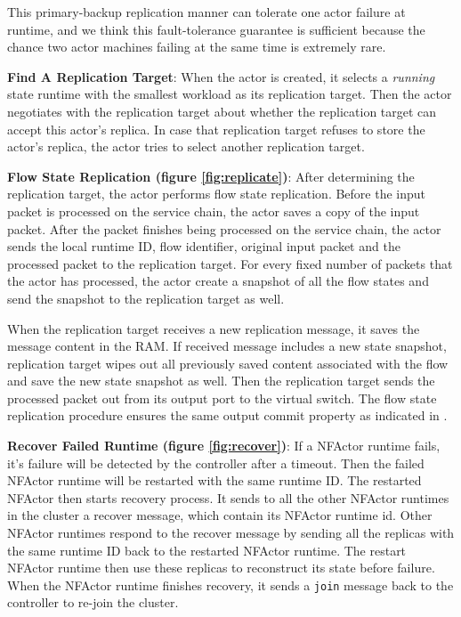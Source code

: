 This primary-backup replication manner can tolerate one actor failure at 
runtime, and we think this fault-tolerance guarantee is sufficient because the 
chance two actor machines failing at the same time is extremely rare.

\textbf{Find A Replication Target}: When the actor is created, it selects a
\textit{running} state runtime with the smallest workload as its replication
target. Then the actor negotiates with the replication target about whether the
replication target can accept this actor's replica. In case that replication
target refuses to store the actor's replica, the actor tries to select
another replication target. 

\textbf{Flow State Replication (figure \ref{fig:replicate})}: After determining
the replication target, the actor performs flow state replication. Before the input packet is processed on
the service chain, the actor saves a copy of the input packet. After the packet
finishes being processed on the service chain, the actor sends the local runtime
ID, flow identifier, original input packet and the processed packet to the
replication target. For every fixed number of packets that the actor has processed, the actor create a
snapshot of all the flow states and send the snapshot to the replication target as well.

When the replication target receives a new replication message, it saves the
message content in the RAM. If received message includes a new state snapshot,
replication target wipes out all previously saved content associated with the flow and save the new
state snapshot as well. Then the replication target sends the processed
packet out from its output port to the virtual switch. The flow state
replication procedure ensures the same output commit property as indicated in
\cite{sherry2015rollback}.

\textbf{Recover Failed Runtime (figure \ref{fig:recover})}: If a NFActor runtime
fails, it's failure will be detected by the controller after a timeout. Then the failed NFActor runtime will be restarted
with the same runtime ID. The restarted NFActor then starts recovery process. It
sends to all the other NFActor runtimes in the cluster a recover message, which
contain its NFActor runtime id. Other NFActor runtimes respond to the recover
message by sending all the replicas with the same runtime ID back to the
restarted NFActor runtime. The restart NFActor runtime then use these replicas
to reconstruct its state before failure. When the NFActor runtime finishes
recovery, it sends a {\tt join} message back to the controller to re-join the
cluster. 

